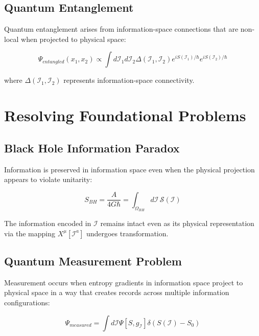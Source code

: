 \documentclass{article}
\begin{document}
\subsection{Quantum Entanglement}

Quantum entanglement arises from information-space connections that are non-local when projected to physical space:

\begin{equation}
\Psi_{entangled}(x_1, x_2) \propto \int d\mathcal{I}_1 d\mathcal{I}_2 \Delta(\mathcal{I}_1, \mathcal{I}_2) e^{iS(\mathcal{I}_1)/\hbar} e^{iS(\mathcal{I}_2)/\hbar}
\end{equation}

where $\Delta(\mathcal{I}_1, \mathcal{I}_2)$ represents information-space connectivity.

\section{Resolving Foundational Problems}

\subsection{Black Hole Information Paradox}

Information is preserved in information space even when the physical projection appears to violate unitarity:

\begin{equation}
S_{BH} = \frac{A}{4G\hbar} = \int_{\Omega_{BH}} d\mathcal{I} \, \mathcal{S}(\mathcal{I})
\end{equation}

The information encoded in $\mathcal{I}$ remains intact even as its physical representation via the mapping $X^\mu[\mathcal{I}^a]$ undergoes transformation.

\subsection{Quantum Measurement Problem}

Measurement occurs when entropy gradients in information space project to physical space in a way that creates records across multiple information configurations:

\begin{equation}
\Psi_{measured} = \int d\mathcal{I} \Psi[S, g_\mathcal{I}] \delta(S(\mathcal{I}) - S_0)
\end{equation}
\end{document}
